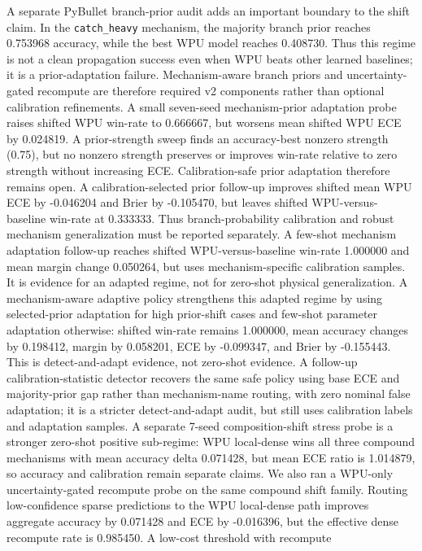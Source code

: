 \documentclass[11pt]{article}
\begin{document}
A separate PyBullet branch-prior audit adds an important boundary to the shift
claim. In the \texttt{catch\_heavy} mechanism, the majority branch prior reaches
0.753968 accuracy, while the best WPU model reaches 0.408730. Thus this regime
is not a clean propagation success even when WPU beats other learned baselines;
it is a prior-adaptation failure. Mechanism-aware branch priors and
uncertainty-gated recompute are therefore required v2 components rather than
optional calibration refinements. A small seven-seed mechanism-prior adaptation
probe raises shifted WPU win-rate to 0.666667, but worsens mean shifted WPU ECE
by 0.024819. A prior-strength sweep finds an accuracy-best nonzero strength
(0.75), but no nonzero strength preserves or improves win-rate relative to
zero strength without increasing ECE. Calibration-safe prior adaptation
therefore remains open. A calibration-selected prior follow-up improves shifted
mean WPU ECE by -0.046204 and Brier by -0.105470, but leaves shifted
WPU-versus-baseline win-rate at 0.333333. Thus branch-probability calibration
and robust mechanism generalization must be reported separately. A few-shot
mechanism adaptation follow-up reaches shifted WPU-versus-baseline win-rate
1.000000 and mean margin change 0.050264, but uses mechanism-specific
calibration samples. It is evidence for an adapted regime, not for zero-shot
physical generalization. A mechanism-aware adaptive policy strengthens this
adapted regime by using selected-prior adaptation for high prior-shift cases
and few-shot parameter adaptation otherwise: shifted win-rate remains 1.000000,
mean accuracy changes by 0.198412, margin by 0.058201, ECE by -0.099347, and
Brier by -0.155443. This is detect-and-adapt evidence, not zero-shot evidence.
A follow-up calibration-statistic detector recovers the same safe policy using
base ECE and majority-prior gap rather than mechanism-name routing, with zero
nominal false adaptation; it is a stricter detect-and-adapt audit, but still
uses calibration labels and adaptation samples.
A separate 7-seed composition-shift stress probe is a
stronger zero-shot positive sub-regime: WPU local-dense wins all three compound
mechanisms with mean accuracy delta 0.071428, but mean ECE ratio is 1.014879,
so accuracy and calibration remain separate claims.
We also ran a WPU-only uncertainty-gated recompute probe on the same compound
shift family. Routing low-confidence sparse predictions to the WPU local-dense
path improves aggregate accuracy by 0.071428 and ECE by -0.016396, but the
effective dense recompute rate is 0.985450. A low-cost threshold with recompute
\end{document}
